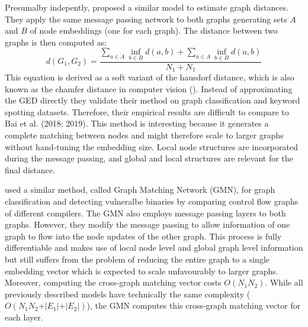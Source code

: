 Presumalby indepently, \cite{riba2018} proposed a similar model to estimate graph distances. They apply the same message passing network to both graphs generating sets $A$ and $B$ of node embeddings (one for each graph). The distance between two graphs is then computed as:
\begin{equation}
     d(G_{1}, G_{2}) = \frac{\sum_{a \in A} \inf_{b \in B} d(a, b) + \sum_{a \in A} \inf_{b \in B} d(a, b)}{N_1 + N_1}
\end{equation}
This equation is derived as a soft variant of the hausdorf distance, which is also known as the chamfer distance in computer vision (\citealp{chamfer1977}). Instead of approximating the GED directly they validate their method on graph classification and keyword spotting datasets. Therefore, their empirical results are difficult to compare to Bai et al. (2018; 2019). This method is interesting because it generates a complete matching between nodes and might therefore scale to larger graphs without hand-tuning the embedding size. Local node structures are incorporated during the message passing, and global and local structures are relevant for the final distance.

\cite{li2019} used a similar method, called Graph Matching Network (GMN), for graph classification and detecting vulneralbe binaries by comparing control flow graphs of different compilers. The GMN also employs message passing layers to both graphs. However, they modify the message passing to allow information of one graph to flow into the node updates of the other graph. %
This process is fully differentiable and makes use of local node level and global graph level information but still suffers from the problem of reducing the entire graph to a single embedding vector which is expected to scale unfavourably to larger graphs. Moreover, computing the cross-graph matching vector costs $O(N_1 N_2)$. While all previously described models have technically the same complexity ($O(N_1 N_2 + \vert E_1 \vert + \vert E_2 \vert)$), the GMN computes this cross-graph matching vector for each layer.



